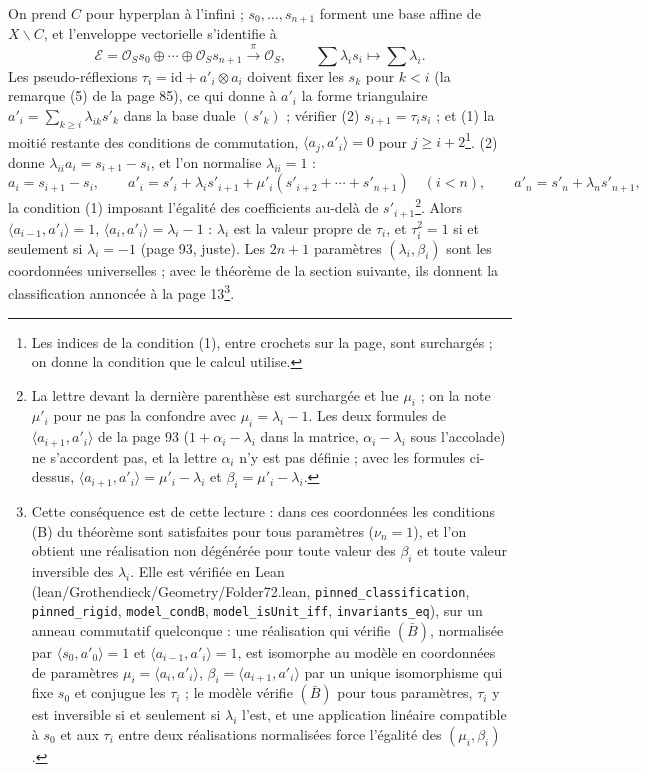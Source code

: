 \documentclass[11pt,a4paper]{article}
\begin{document}
On prend $C$ pour hyperplan à l'infini ; $s_0, \ldots, s_{n+1}$ forment une base
affine de $X \smallsetminus C$, et l'enveloppe vectorielle s'identifie à
\[
\mathcal{E} = \mathcal{O}_S s_0 \oplus \cdots \oplus \mathcal{O}_S s_{n+1}
\xrightarrow{\ \pi\ } \mathcal{O}_S, \qquad \textstyle\sum \lambda_i s_i
\mapsto \sum \lambda_i .
\]
Les pseudo-réflexions $\tau_i = \mathrm{id} + a'_i \otimes a_i$ doivent
fixer les $s_k$ pour $k < i$ (la remarque (5) de la page 85), ce qui donne à
$a'_i$ la forme triangulaire $a'_i = \sum_{k \geqslant i} \lambda_{ik} s'_k$
dans la base duale $(s'_k)$ ; vérifier (2) $s_{i+1} = \tau_i s_i$ ; et (1) la
moitié restante des conditions de commutation, $\langle a_j, a'_i \rangle = 0$
pour $j \geqslant i + 2$\footnote{Les indices de la condition (1), entre
crochets sur la page, sont surchargés ; on donne la condition que le calcul
utilise.}. (2) donne $\lambda_{ii} a_i = s_{i+1} - s_i$, et l'on normalise
$\lambda_{ii} = 1$ :
\[
a_i = s_{i+1} - s_i, \qquad a'_i = s'_i + \lambda_i s'_{i+1} + \mu'_i(s'_{i+2} +
\cdots + s'_{n+1}) \quad (i < n), \qquad a'_n = s'_n + \lambda_n s'_{n+1} ,
\]
la condition (1) imposant l'égalité des coefficients au-delà de
$s'_{i+1}$\footnote{La lettre devant la dernière parenthèse est surchargée et lue
$\mu_i$ ; on la note $\mu'_i$ pour ne pas la confondre avec $\mu_i = \lambda_i
- 1$. Les deux formules de $\langle a_{i+1}, a'_i \rangle$ de la page 93
($1 + \alpha_i - \lambda_i$ dans la matrice, $\alpha_i - \lambda_i$ sous
l'accolade) ne s'accordent pas, et la lettre $\alpha_i$ n'y est pas définie ;
avec les formules ci-dessus, $\langle a_{i+1}, a'_i \rangle = \mu'_i - \lambda_i$
et $\beta_i = \mu'_i - \lambda_i$.}. Alors $\langle a_{i-1}, a'_i \rangle = 1$,
$\langle a_i, a'_i \rangle = \lambda_i - 1$ : $\lambda_i$ est la valeur propre de
$\tau_i$, et $\tau_i^2 = 1$ si et seulement si $\lambda_i = -1$ (page 93, juste).
Les $2n+1$ paramètres $(\lambda_i, \beta_i)$ sont les coordonnées universelles ;
avec le théorème de la section suivante, ils donnent la classification
annoncée à la page 13\footnote{Cette conséquence est de cette lecture : dans
ces coordonnées les conditions (B) du théorème sont satisfaites pour tous
paramètres ($\nu_n = 1$), et l'on obtient une réalisation non dégénérée pour
toute valeur des $\beta_i$ et toute valeur inversible des $\lambda_i$.
Elle est vérifiée en Lean (lean/Grothendieck/Geometry/Folder72.lean,
\texttt{pinned\_classification}, \texttt{pinned\_rigid},
\texttt{model\_condB}, \texttt{model\_isUnit\_iff}, \texttt{invariants\_eq}),
sur un anneau commutatif quelconque : une réalisation qui vérifie $(\bar B)$,
normalisée par $\langle s_0, a'_0 \rangle = 1$ et $\langle a_{i-1}, a'_i \rangle
= 1$, est isomorphe au modèle en coordonnées de paramètres $\mu_i = \langle a_i,
a'_i \rangle$, $\beta_i = \langle a_{i+1}, a'_i \rangle$ par un unique
isomorphisme qui fixe $s_0$ et conjugue les $\tau_i$ ; le modèle vérifie
$(\bar B)$ pour tous paramètres, $\tau_i$ y est inversible si et seulement si
$\lambda_i$ l'est, et une application linéaire compatible à $s_0$ et aux
$\tau_i$ entre deux réalisations normalisées force l'égalité des $(\mu_i,
\beta_i)$.}.
\end{document}
